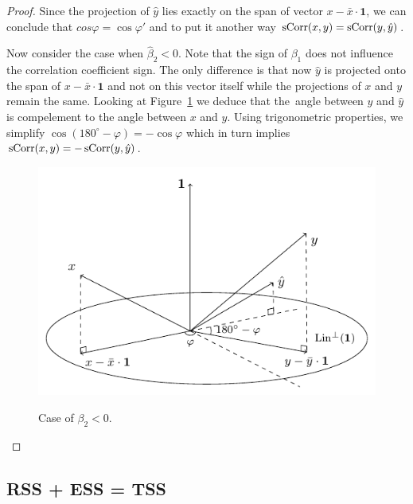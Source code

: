 \begin{proof}
Since the projection of $\hat y$ lies exactly on the span of vector $x - \bar x \cdot \mathbf{1}$, we can conclude that $cos \varphi = \cos \varphi '$ and to put it another way $\operatorname{sCorr}(x,y) = \operatorname{sCorr}(y, \hat y)$.

Now consider the case when $\hat \beta_2 < 0$.
Note that the sign of $\beta_1$ does not influence the correlation coefficient sign.
The only difference is that now $\hat y$ is projected onto the span of  $x - \bar x \cdot \mathbf{1}$ and not on this vector itself while the projections of $x$ and $y$ remain the same.
Looking at Figure~\ref{fig:corr_negative} we deduce
that the~angle between $y$ and $\hat y$ is compelement to the angle between $x$ and $y$.
Using trigonometric properties, we simplify $\cos(180^{\circ} - \varphi) = -\cos\varphi$
which in turn implies $\operatorname{sCorr}(x,y) = -\operatorname{sCorr}(y,\hat y)$.

\begin{figure}[h!]
\begin{center}
\includegraphics{figures/02_simple_regression_coefficient_negative.pdf}
\label{fig:corr_negative}
\caption{Case of $\beta_2 < 0$.}
\end{center}
\end{figure}
\end{proof}


\subsection{RSS + ESS = TSS}

